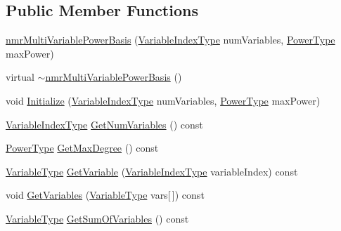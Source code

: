 \subsection*{Public Member Functions}
\begin{DoxyCompactItemize}
\item 
\hyperlink{classnmr_multi_variable_power_basis_a727f2584bad937534d6eeca23ffbd3b0}{nmr\-Multi\-Variable\-Power\-Basis} (\hyperlink{classnmr_multi_variable_power_basis_ae125326a623043fcfd020aeeefd1cce6}{Variable\-Index\-Type} num\-Variables, \hyperlink{classnmr_multi_variable_power_basis_a2cb67df83e9fcac213848fa7a7295fcc}{Power\-Type} max\-Power)
\item 
virtual \hyperlink{classnmr_multi_variable_power_basis_ac361dfb96b564a860a61cefe72f43524}{$\sim$nmr\-Multi\-Variable\-Power\-Basis} ()
\item 
void \hyperlink{classnmr_multi_variable_power_basis_a22be51c2f0a788c36ac810e1d6763db3}{Initialize} (\hyperlink{classnmr_multi_variable_power_basis_ae125326a623043fcfd020aeeefd1cce6}{Variable\-Index\-Type} num\-Variables, \hyperlink{classnmr_multi_variable_power_basis_a2cb67df83e9fcac213848fa7a7295fcc}{Power\-Type} max\-Power)
\item 
\hyperlink{classnmr_multi_variable_power_basis_ae125326a623043fcfd020aeeefd1cce6}{Variable\-Index\-Type} \hyperlink{classnmr_multi_variable_power_basis_ade86b45873454555b8417a146e20f368}{Get\-Num\-Variables} () const 
\item 
\hyperlink{classnmr_multi_variable_power_basis_a2cb67df83e9fcac213848fa7a7295fcc}{Power\-Type} \hyperlink{classnmr_multi_variable_power_basis_a1772b3f297ffdc8f1ce69c1d43c9d6b8}{Get\-Max\-Degree} () const 
\item 
\hyperlink{classnmr_multi_variable_power_basis_a7089007a79cce8d2eb3672e2d61af06c}{Variable\-Type} \hyperlink{classnmr_multi_variable_power_basis_a7a85823d5207aa3b34417cd06dd33030}{Get\-Variable} (\hyperlink{classnmr_multi_variable_power_basis_ae125326a623043fcfd020aeeefd1cce6}{Variable\-Index\-Type} variable\-Index) const 
\item 
void \hyperlink{classnmr_multi_variable_power_basis_a845d31e9089294a04516bfcd03633d9a}{Get\-Variables} (\hyperlink{classnmr_multi_variable_power_basis_a7089007a79cce8d2eb3672e2d61af06c}{Variable\-Type} vars\mbox{[}$\,$\mbox{]}) const 
\item 
\hyperlink{classnmr_multi_variable_power_basis_a7089007a79cce8d2eb3672e2d61af06c}{Variable\-Type} \hyperlink{classnmr_multi_variable_power_basis_aad9a850d32b0f1babe1987cda49e4a1a}{Get\-Sum\-Of\-Variables} () const 

\end{DoxyCompactItemize}
